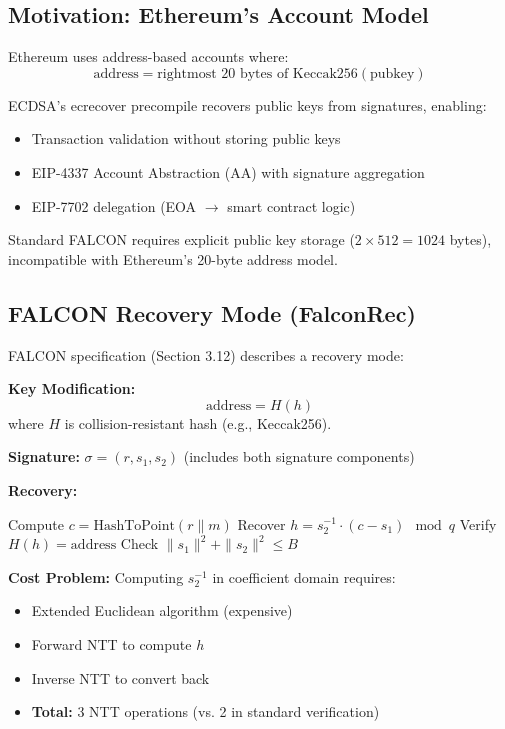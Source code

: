 \documentclass[11pt,a4paper]{article}
\begin{document}
\subsection{Motivation: Ethereum's Account Model}

Ethereum uses address-based accounts where:
\begin{equation}
\text{address} = \text{rightmost 20 bytes of } \text{Keccak256}(\text{pubkey})
\end{equation}

ECDSA's ecrecover precompile recovers public keys from signatures, enabling:
\begin{itemize}
    \item Transaction validation without storing public keys
    \item EIP-4337 Account Abstraction (AA) with signature aggregation
    \item EIP-7702 delegation (EOA $\rightarrow$ smart contract logic)
\end{itemize}

Standard FALCON requires explicit public key storage ($2 \times 512 = 1024$ bytes), incompatible with Ethereum's 20-byte address model.

\subsection{FALCON Recovery Mode (FalconRec)}

FALCON specification (Section 3.12) \cite{falcon2020} describes a recovery mode:

\textbf{Key Modification:}
\begin{equation}
\text{address} = H(h)
\end{equation}
where $H$ is collision-resistant hash (e.g., Keccak256).

\textbf{Signature:} $\sigma = (r, s_1, s_2)$ (includes both signature components)

\textbf{Recovery:}
\begin{algorithmic}[1]
\STATE Compute $c = \text{HashToPoint}(r \| m)$
\STATE Recover $h = s_2^{-1} \cdot (c - s_1) \mod q$
\STATE Verify $H(h) = \text{address}$
\STATE Check $\|s_1\|^2 + \|s_2\|^2 \leq B$
\end{algorithmic}

\textbf{Cost Problem:} Computing $s_2^{-1}$ in coefficient domain requires:
\begin{itemize}
    \item Extended Euclidean algorithm (expensive)
    \item Forward NTT to compute $h$
    \item Inverse NTT to convert back
    \item \textbf{Total:} 3 NTT operations (vs. 2 in standard verification)
\end{itemize}
\end{document}

